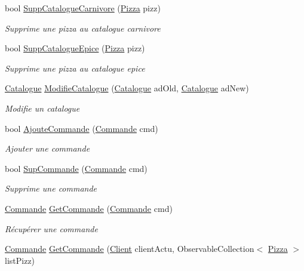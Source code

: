 \begin{DoxyCompactItemize}
bool \hyperlink{classModele_1_1Manager_aac1f92fbb473703125ba41e9903f808e}{Supp\+Catalogue\+Carnivore} (\hyperlink{classModele_1_1Pizza}{Pizza} pizz)
\begin{DoxyCompactList}\small\item\em Supprime une pizza au catalogue carnivore \end{DoxyCompactList}\item 
bool \hyperlink{classModele_1_1Manager_a88f23540b7d8952994f3bbdf9e7d9e51}{Supp\+Catalogue\+Epice} (\hyperlink{classModele_1_1Pizza}{Pizza} pizz)
\begin{DoxyCompactList}\small\item\em Supprime une pizza au catalogue epice \end{DoxyCompactList}\item 
\hyperlink{classModele_1_1Catalogue}{Catalogue} \hyperlink{classModele_1_1Manager_a62c5004c6c46fb13f010669ea2e4937a}{Modifie\+Catalogue} (\hyperlink{classModele_1_1Catalogue}{Catalogue} ad\+Old, \hyperlink{classModele_1_1Catalogue}{Catalogue} ad\+New)
\begin{DoxyCompactList}\small\item\em Modifie un catalogue \end{DoxyCompactList}\item 
bool \hyperlink{classModele_1_1Manager_a4353e79d770294bd16ecdbbbdde48e2e}{Ajoute\+Commande} (\hyperlink{classModele_1_1Commande}{Commande} cmd)
\begin{DoxyCompactList}\small\item\em Ajouter une commande \end{DoxyCompactList}\item 
bool \hyperlink{classModele_1_1Manager_a2c5255bdd1628cbe62c8d72cba13de83}{Sup\+Commande} (\hyperlink{classModele_1_1Commande}{Commande} cmd)
\begin{DoxyCompactList}\small\item\em Supprime une commande \end{DoxyCompactList}\item 
\hyperlink{classModele_1_1Commande}{Commande} \hyperlink{classModele_1_1Manager_a66c28c0c613264bb1e0b0abc1d0fc97f}{Get\+Commande} (\hyperlink{classModele_1_1Commande}{Commande} cmd)
\begin{DoxyCompactList}\small\item\em Récupérer une commande \end{DoxyCompactList}\item 
\hyperlink{classModele_1_1Commande}{Commande} \hyperlink{classModele_1_1Manager_aaa9cb4ae995548ff3f12823c4f08e4a8}{Get\+Commande} (\hyperlink{classModele_1_1Client}{Client} client\+Actu, Observable\+Collection$<$ \hyperlink{classModele_1_1Pizza}{Pizza} $>$ list\+Pizz)

\end{DoxyCompactItemize}
